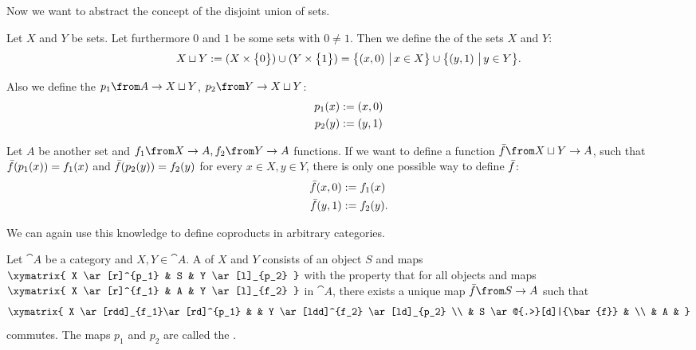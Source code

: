 Now we want to abstract the concept of the disjoint union of sets.

\begin{example}
  \label{ex:coprod:dunion}
  Let $X$ and $Y$ be sets.
  Let furthermore $0$ and $1$ be some sets with $0 \ne 1$.
  Then we define the  of the sets $X$ and $Y$:
  $$X \sqcup Y := (X \times \bigl \{ 0 \bigr \}) \cup (Y \times \bigl \{ 1 \bigr \}) = \bigl \{ \left( x , 0 \right) \,\big|\, x \in X \bigr \} \cup \bigl \{ \left( y , 1 \right) \,\big|\, y \in Y \bigr \}.$$

  Also we define the  $p_1 \from A \to X \dunion Y$, $p_2 \from Y \to X \dunion Y$:
  \begin{alignat*}{2}
    p_1(x) &:= \left( x , 0 \right) \\
    p_2(y) &:= \left( y , 1 \right)
  \end{alignat*}

  Let $A$ be another set and $f_1 \from X \to A, f_2 \from Y \to A$ functions.
  If we want to define a function $\fbar \from X \dunion Y \to A$, such that
  $\bar{f}(p_1(x)) = f_1(x)$ and $\bar{f}(p_2(y)) = f_2(y)$ for every $x \in X, y \in Y$,
  there is only one possible way to define $\bar{f}$:
  \begin{alignat*}{2}
    \bar{f}(x, 0) &:= f_1(x) \\
    \bar{f}(y, 1) &:= f_2(y).
  \end{alignat*}
\end{example}

We can again use this knowledge to define coproducts in arbitrary categories.

\begin{definition}[Coproduct]
  \label{def:coproduct}
  Let $\cat{A}$ be a category and $X, Y \in \cat{A}$.
  A  of $X$ and $Y$ consists of an object $S$ and maps
  $ \xymatrix{
    X \ar[r]^{p_1} & S & Y \ar[l]_{p_2}
  } $
  with the property that for all objects and maps
  $ \xymatrix{
    X \ar[r]^{f_1} & A & Y \ar[l]_{f_2}
  } $
  in $\cat{A}$, there exists a unique map $\bar{f}\from S \to A$ such that
  \[ \xymatrix{
    X \ar[rdd]_{f_1}\ar[rd]^{p_1} & & Y \ar[ldd]^{f_2} \ar[ld]_{p_2} \\
    & S \ar@{.>}[d]|{\bar{f}} & \\
    & A &
  } \]
  commutes. The maps $p_1$ and $p_2$ are called the .
\end{definition}

